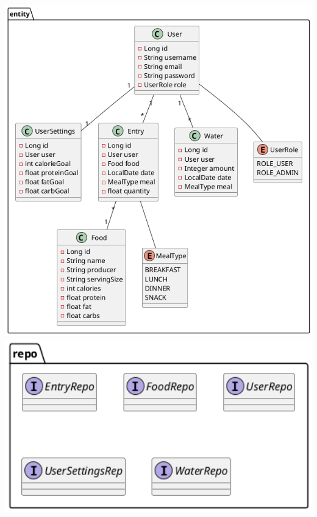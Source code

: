 \documentclass[a4paper,10pt]{article}
\begin{document}
            \includegraphics[width=1\textwidth]{class_entity}
            \includegraphics[width=1\textwidth]{class_repo}
\end{document}
